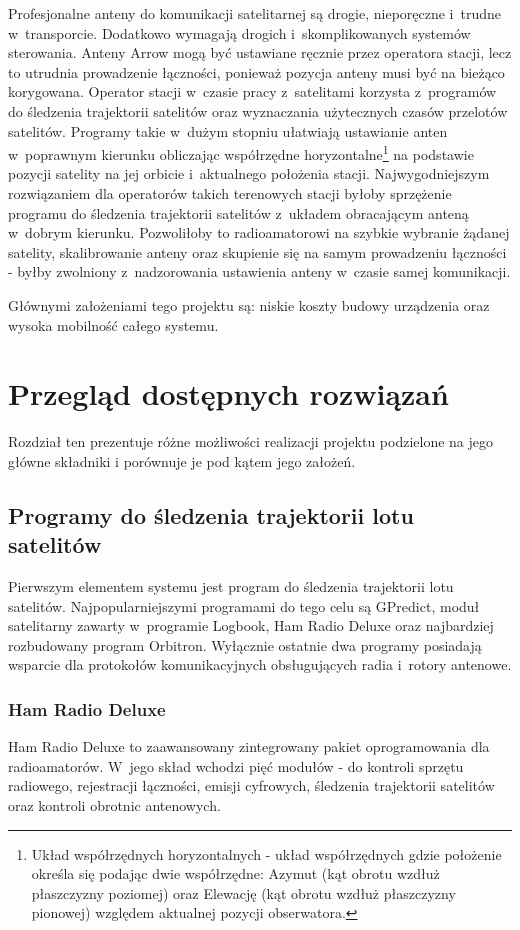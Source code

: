 \documentclass[eng,oneside]{mgr}
\begin{document}
		Profesjonalne anteny do komunikacji satelitarnej są drogie, nieporęczne i~trudne w~transporcie. Dodatkowo wymagają drogich i~skomplikowanych systemów sterowania. Anteny Arrow mogą być ustawiane ręcznie przez operatora stacji, lecz to utrudnia prowadzenie łączności, ponieważ pozycja anteny musi być na bieżąco korygowana. Operator stacji w~czasie pracy z~satelitami korzysta z~programów do śledzenia trajektorii satelitów oraz wyznaczania użytecznych czasów przelotów satelitów. Programy takie w~dużym stopniu ułatwiają ustawianie anten w~poprawnym kierunku obliczając współrzędne horyzontalne\footnote{Układ współrzędnych horyzontalnych - układ współrzędnych gdzie położenie określa się podając dwie współrzędne: Azymut (kąt obrotu wzdłuż płaszczyzny poziomej) oraz Elewację (kąt obrotu wzdłuż płaszczyzny pionowej) względem aktualnej pozycji obserwatora.} na podstawie pozycji satelity na jej orbicie i~aktualnego położenia stacji. Najwygodniejszym rozwiązaniem dla operatorów takich terenowych stacji byłoby sprzężenie programu do śledzenia trajektorii satelitów z~układem obracającym anteną w~dobrym kierunku. Pozwoliłoby to radioamatorowi na szybkie wybranie żądanej satelity, skalibrowanie anteny oraz skupienie się na samym prowadzeniu łączności - byłby zwolniony z~nadzorowania ustawienia anteny w~czasie samej komunikacji. 

		Głównymi założeniami tego projektu są: niskie koszty budowy urządzenia oraz wysoka mobilność całego systemu.

	\chapter{Przegląd dostępnych rozwiązań}
	\label{sec:existing_possibilities}
	Rozdział ten prezentuje różne możliwości realizacji projektu podzielone na jego główne składniki i porównuje je pod kątem jego założeń.
	
		\section{Programy do śledzenia trajektorii lotu satelitów}
		Pierwszym elementem systemu jest program do śledzenia trajektorii lotu satelitów. Najpopularniejszymi programami do tego celu są GPredict, moduł satelitarny zawarty w~programie Logbook, Ham Radio Deluxe oraz najbardziej rozbudowany program Orbitron. Wyłącznie ostatnie dwa programy posiadają wsparcie dla protokołów komunikacyjnych obsługujących radia i~rotory antenowe.

			\subsection{Ham Radio Deluxe}
			Ham Radio Deluxe to zaawansowany zintegrowany pakiet oprogramowania dla radioamatorów. W~jego skład wchodzi pięć modułów - do kontroli sprzętu radiowego, rejestracji łączności, emisji cyfrowych, śledzenia trajektorii satelitów oraz kontroli obrotnic antenowych.
\end{document}
